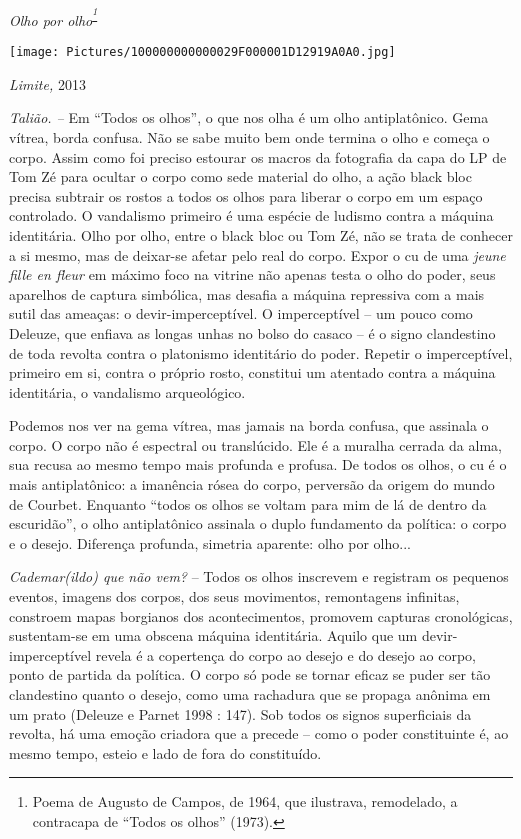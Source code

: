 \emph{Olho por olho}\textsuperscript{\emph{\footnote{Poema de Augusto de
  Campos, de 1964, que ilustrava, remodelado, a contracapa de ``Todos os
  olhos'' (1973).}}}

\texttt{[image: Pictures/100000000000029F000001D12919A0A0.jpg]}

\emph{Limite, }2013

\emph{Talião. -- }Em ``Todos os olhos'', o que nos olha é um olho
antiplatônico. Gema vítrea, borda confusa. Não se sabe muito bem onde
termina o olho e começa o corpo. Assim como foi preciso estourar os
macros da fotografia da capa do LP de Tom Zé para ocultar o corpo como
sede material do olho, a ação black bloc precisa subtrair os rostos a
todos os olhos para liberar o corpo em um espaço controlado. O
vandalismo primeiro é uma espécie de ludismo contra a máquina
identitária. Olho por olho, entre o black bloc ou Tom Zé, não se trata
de conhecer a si mesmo, mas de deixar-se afetar pelo real do corpo.
Expor\emph{ }o cu de uma \emph{jeune fille en fleur} em máximo foco na
vitrine não apenas testa o olho do poder, seus aparelhos de captura
simbólica, mas desafia a máquina repressiva com a mais sutil das
ameaças: o devir-imperceptível. O imperceptível -- um pouco como
Deleuze, que enfiava as longas unhas no bolso do casaco -- é o signo
clandestino de toda revolta contra o platonismo identitário do poder.
Repetir o imperceptível, primeiro em si, contra o próprio rosto,
constitui um atentado contra a máquina identitária, o vandalismo
arqueológico.

Podemos nos ver na gema vítrea, mas jamais na borda confusa, que
assinala o corpo. O corpo não é espectral ou translúcido. Ele é a
muralha cerrada da alma, sua recusa ao mesmo tempo mais profunda e
profusa. De todos os olhos, o cu é o mais antiplatônico: a imanência
rósea do corpo, perversão da origem do mundo de Courbet. Enquanto
``todos os olhos se voltam para mim de lá de dentro da escuridão'', o
olho antiplatônico assinala o duplo fundamento da política: o corpo e o
desejo. Diferença profunda, simetria aparente: olho por olho...

\emph{Cademar(ildo) que não vem? }-- Todos os olhos inscrevem e
registram os pequenos eventos, imagens dos corpos, dos seus movimentos,
remontagens infinitas, constroem mapas borgianos dos acontecimentos,
promovem capturas cronológicas, sustentam-se em uma obscena máquina
identitária. Aquilo que um devir-imperceptível revela é a copertença do
corpo ao desejo e do desejo ao corpo, ponto de partida da política. O
corpo só pode se tornar eficaz se puder ser tão clandestino quanto o
desejo, como uma rachadura que se propaga anônima em um prato (Deleuze e
Parnet 1998 : 147). Sob todos os signos superficiais da revolta, há uma
emoção criadora que a precede -- como o poder constituinte é, ao mesmo
tempo, esteio e lado de fora do constituído.

